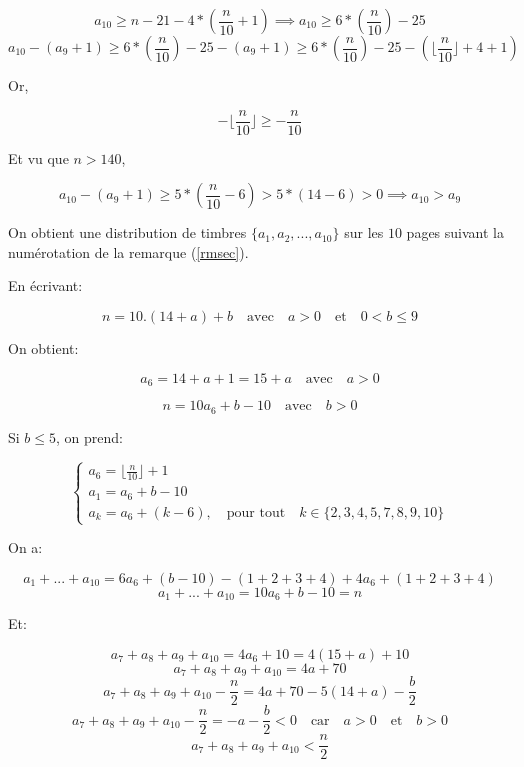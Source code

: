 \documentclass[12pt,a4paper,article]{memoir}
\newcommand{\floor}[1]{\lfloor #1 \rfloor}
\begin{document}
\[a_{10} \geq n - 21 - 4*(\frac{n}{10} + 1) \implies a_{10} \geq 6*(\frac{n}{10}) - 25\]
\[a_{10} - (a_{9} + 1) \geq 6*(\frac{n}{10}) - 25 - (a_{9} + 1) \geq 6*(\frac{n}{10}) - 25 - (\floor{\frac{n}{10}} + 4 + 1) \]

Or,

\[-\floor{\frac{n}{10}} \geq -\frac{n}{10}\]

Et vu que $n > 140$, 

\[a_{10} - (a_{9} + 1) \geq 5*(\frac{n}{10} - 6) > 5*(14 - 6) > 0 \implies a_{10} > a_{9} \]

On obtient une distribution de timbres $\{a_{1}, a_{2}, ..., a_{10}\}$ sur les $10$ pages suivant la numérotation de la remarque (\ref{rmsec}).

\bigskip

En écrivant:

\begin{equation}
n = 10.(14+a) + b \quad \textrm{avec} \quad a > 0 \quad \textrm{et} \quad 0 < b \leq 9
\label{equation-dec-nsup140}
\end{equation}

On obtient:

\begin{equation}
a_{6} = 14 + a + 1 = 15 + a \quad \textrm{avec} \quad a > 0
\label{equation-dec-a6}
\end{equation}

\begin{equation}
n = 10a_{6} + b - 10 \quad \textrm{avec} \quad b > 0
\label{equation-dec-a6}
\end{equation}

Si $b \leq 5$, on prend: 

\begin{equation}
\left\{
	\begin{array}{l}
	a_{6} = \floor{\frac{n}{10}} + 1\\
	a_{1} = a_{6} + b - 10\\
	a_{k} = a_{6} + (k - 6), \quad \textrm{pour tout} \quad k \in \{2, 3, 4, 5, 7, 8, 9, 10\}
	\end{array}
\right.
\label{equation-def-exp-distsup140-binf5}
\end{equation}

On a:

\[a_{1} + ... + a_{10} = 6a_{6} + (b - 10) - (1+ 2 + 3 + 4) + 4a_{6} + (1 + 2 + 3 + 4) \]
\[a_{1} + ... + a_{10} = 10a_{6} + b - 10 = n \]

Et:

\[a_{7} + a_{8} + a_{9} + a_{10} = 4a_{6} + 10 = 4(15 + a) + 10 \]
\[a_{7} + a_{8} + a_{9} + a_{10} = 4a + 70\]
\[a_{7} + a_{8} + a_{9} + a_{10} - \frac{n}{2} = 4a + 70 - 5(14 + a) - \frac{b}{2} \]
\[a_{7} + a_{8} + a_{9} + a_{10} - \frac{n}{2} = - a - \frac{b}{2} < 0 \quad \textrm{car} \quad a > 0 \quad \textrm{et} \quad b > 0 \]
\[a_{7} + a_{8} + a_{9} + a_{10} < \frac{n}{2}\]
\end{document}
